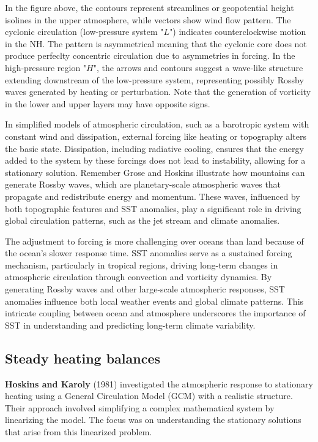 In the figure above, the contours represent streamlines or geopotential height isolines in the upper atmosphere, while vectors show wind flow pattern. The cyclonic circulation (low-pressure system "$L$") indicates counterclockwise motion in the NH. The pattern is asymmetrical meaning that the cyclonic core does not produce perfeclty concentric circulation due to asymmetries in forcing. In the high-pressure region "$H$", the arrows and contours suggest a wave-like structure extending downstream of the low-pressure system, representing possibly Rossby waves generated by heating or perturbation. Note that the generation of vorticity in the lower and upper layers may have opposite signs.



In simplified models of atmospheric circulation, such as a barotropic system with constant wind and dissipation, external forcing like heating or topography alters the basic state. Dissipation, including radiative cooling, ensures that the energy added to the system by these forcings does not lead to instability, allowing for a stationary solution. Remember Grose and Hoskins illustrate how mountains can generate Rossby waves, which are planetary-scale atmospheric waves that propagate and redistribute energy and momentum. These waves, influenced by both topographic features and SST anomalies, play a significant role in driving global circulation patterns, such as the jet stream and climate anomalies.

The adjustment to forcing is more challenging over oceans than land because of the ocean’s slower response time. SST anomalies serve as a sustained forcing mechanism, particularly in tropical regions, driving long-term changes in atmospheric circulation through convection and vorticity dynamics. By generating Rossby waves and other large-scale atmospheric responses, SST anomalies influence both local weather events and global climate patterns. This intricate coupling between ocean and atmosphere underscores the importance of SST in understanding and predicting long-term climate variability.\\[0.25 cm]

\subsection{Steady heating balances}
\textbf{Hoskins and Karoly}\cite{Hos81} (1981) investigated the atmospheric response to stationary heating using a General Circulation Model (GCM) with a realistic structure. Their approach involved simplifying a complex mathematical system by linearizing the model. The focus was on understanding the stationary solutions that arise from this linearized problem.

